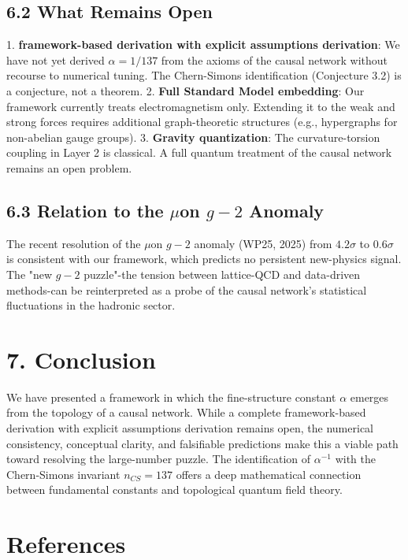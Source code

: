 \documentclass[11pt,a4paper]{article}
\theoremstyle{plain}
\theoremstyle{definition}
\begin{document}
\subsection{6.2 What Remains Open}

1. \textbf{framework-based derivation with explicit assumptions derivation}: We have not yet derived $\alpha = 1/137$ from the axioms of the causal network without recourse to numerical tuning. The Chern-Simons identification (Conjecture 3.2) is a conjecture, not a theorem.
2. \textbf{Full Standard Model embedding}: Our framework currently treats electromagnetism only. Extending it to the weak and strong forces requires additional graph-theoretic structures (e.g., hypergraphs for non-abelian gauge groups).
3. \textbf{Gravity quantization}: The curvature-torsion coupling in Layer 2 is classical. A full quantum treatment of the causal network remains an open problem.

\subsection{6.3 Relation to the $\mu$on $g-2$ Anomaly}

The recent resolution of the $\mu$on $g-2$ anomaly (WP25, 2025) from $4.2\sigma$ to $0.6\sigma$ is consistent with our framework, which predicts no persistent new-physics signal. The "new $g-2$ puzzle"-the tension between lattice-QCD and data-driven methods-can be reinterpreted as a probe of the causal network's statistical fluctuations in the hadronic sector.

\textemdash{}

\section{7. Conclusion}

We have presented a framework in which the fine-structure constant $\alpha$ emerges from the topology of a causal network. While a complete framework-based derivation with explicit assumptions derivation remains open, the numerical consistency, conceptual clarity, and falsifiable predictions make this a viable path toward resolving the large-number puzzle. The identification of $\alpha^{-1}$ with the Chern-Simons invariant $n_{CS} = 137$ offers a deep mathematical connection between fundamental constants and topological quantum field theory.

\textemdash{}

\section{References}
\end{document}
